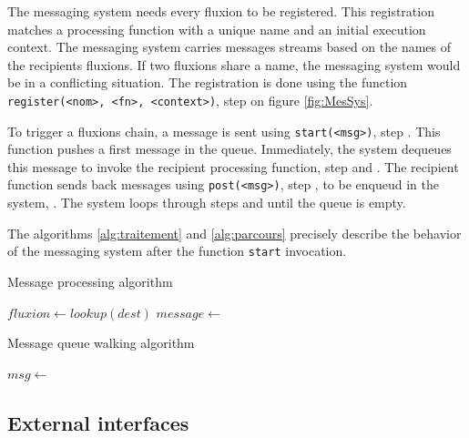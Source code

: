 The messaging system needs every fluxion to be registered.
This registration matches a processing function with a unique name and an initial execution context.
The messaging system carries messages streams based on the names of the recipients fluxions.
If two fluxions share a name, the messaging system would be in a conflicting situation.
The registration is done using the function \texttt{register(<nom>, <fn>, <context>)}, step  on figure \ref{fig:MesSys}.

To trigger a fluxions chain, a message is sent using \texttt{start(<msg>)}, step .
This function pushes a first message in the queue.
Immediately, the system dequeues this message to invoke the recipient processing function, step  and .
The recipient function sends back messages using \texttt{post(<msg>)}, step , to be enqueud in the system, .
The system loops through steps  and  until the queue is empty.

The algorithms \ref{alg:traitement} and \ref{alg:parcours} precisely describe the behavior of the messaging system after the function \texttt{start} invocation.

\begin{algorithm}
\caption{Message processing algorithm}
\label{alg:traitement}
\begin{algorithmic}
\State $fluxion \gets lookup(dest)$
\State $message \gets$  
\State {} 
\EndFor
\EndFunction
\end{algorithmic}
\end{algorithm}

\begin{algorithm}
\caption{Message queue walking algorithm}
\label{alg:parcours}
\begin{algorithmic}
\State $msg \gets$  
\State {}
\EndWhile
\EndFunction
\end{algorithmic}
\end{algorithm}

\subsection{External interfaces}

